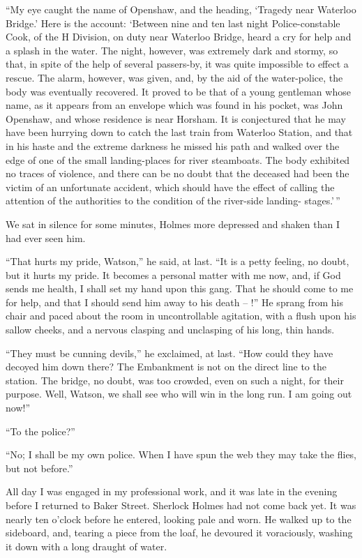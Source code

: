 “My eye caught the name of Openshaw, and the heading,
‘Tragedy near Waterloo Bridge.’ Here is the account: ‘Between
nine and ten last night Police-constable Cook, of the H
Division, on duty near Waterloo Bridge, heard a cry for help
and a splash in the water. The night, however, was extremely
dark and stormy, so that, in spite of the help of several
passers-by, it was quite impossible to effect a rescue. The
alarm, however, was given, and, by the aid of the water-police,
the body was eventually recovered. It proved to be that of a
young gentleman whose name, as it appears from an envelope
which was found in his pocket, was John Openshaw, and
whose residence is near Horsham. It is conjectured that he
may have been hurrying down to catch the last train from
Waterloo Station, and that in his haste and the extreme darkness
he missed his path and walked over the edge of one of
the small landing-places for river steamboats. The body exhibited
no traces of violence, and there can be no doubt that
the deceased had been the victim of an unfortunate accident,
which should have the effect of calling the attention of the
authorities to the condition of the river-side landing-%
stages.’\,”

We sat in silence for some minutes, Holmes more depressed
and shaken than I had ever seen him.

“That hurts my pride, Watson,” he said, at last. “It is a
petty feeling, no doubt, but it hurts my pride. It becomes a
personal matter with me now, and, if God sends me health, I
shall set my hand upon this gang. That he should come
to me for help, and that I should send him away to his
death -- !” He sprang from his chair and paced about the
room in uncontrollable agitation, with a flush upon his sallow
cheeks, and a nervous clasping and unclasping of his long,
thin hands.

“They must be cunning devils,” he exclaimed, at last.
“How could they have decoyed him down there? The Embankment
is not on the direct line to the station. The bridge,
no doubt, was too crowded, even on such a night, for their
purpose. Well, Watson, we shall see who will win in the
long run. I am going out now!”

“To the police?”

“No; I shall be my own police. When I have spun the
web they may take the flies, but not before.”

All day I was engaged in my professional work, and it was
late in the evening before I returned to Baker Street. Sherlock
Holmes had not come back yet. It was nearly ten o’clock
before he entered, looking pale and worn. He walked up to
the sideboard, and, tearing a piece from the loaf, he devoured
it voraciously, washing it down with a long draught of water.

